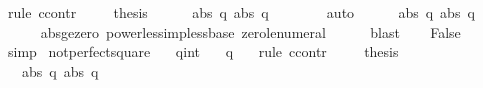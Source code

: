 \begin{isabellebody}
\isamarkupfalse%
\ {\isacharparenleft}rule\ ccontr{\isacharparenright}\isanewline
\ \ \isamarkupfalse%
\ {\isachardoublequoteopen}{\isasymnot}\ {\isacharquery}thesis{\isachardoublequoteclose}\isanewline
\ \ \isamarkupfalse%
\ {\isachardoublequoteopen}{}{\isacharcircum}{}\ {\isacharless}\ {\isacharparenleft}abs\ q{\isacharparenright}{\isacharcircum}{}{\isachardoublequoteclose}\ {\isachardoublequoteopen}{\isacharparenleft}abs\ q{\isacharparenright}{\isacharcircum}{}\ {\isacharless}\ {}{\isacharcircum}{}{\isachardoublequoteclose}\isanewline
\ \ \ \ \isamarkupfalse%
\ auto\isanewline
\ \ \isamarkupfalse%
\ {\isachardoublequoteopen}{}\ {\isacharless}\ abs\ q{\isachardoublequoteclose}\ {\isachardoublequoteopen}abs\ q\ {\isacharless}\ {}{\isachardoublequoteclose}\isanewline
\ \ \ \ \isamarkupfalse%
\ abs{\isacharunderscore}ge{\isacharunderscore}zero\ power{\isacharunderscore}less{\isacharunderscore}imp{\isacharunderscore}less{\isacharunderscore}base\ zero{\isacharunderscore}le{\isacharunderscore}numeral\isanewline
\ \ \ \ \isamarkupfalse%
\ blast{\isacharplus}\isanewline
\ \ \isamarkupfalse%
\ False\isanewline
\ \ \ \ \isamarkupfalse%
\ simp\isanewline
{}\isamarkupfalse%
%
\endisatagproof
{\isafoldproof}%
%
\isadelimproof
\isanewline
%
\endisadelimproof
\isanewline
{}\isamarkupfalse%
\ not{\isacharunderscore}perfect{\isacharunderscore}square{\isacharunderscore}{}{\isacharcolon}\isanewline
\ \ \ q{\isacharcolon}{\isacharcolon}int\isanewline
\ \ \ {\isachardoublequoteopen}q{\isacharcircum}{}\ {\isasymnoteq}\ {}{\isachardoublequoteclose}\isanewline
%
\isadelimproof
%
\endisadelimproof
%
\isatagproof
{}\isamarkupfalse%
\ {\isacharparenleft}rule\ ccontr{\isacharparenright}\isanewline
\ \ \isamarkupfalse%
\ {\isachardoublequoteopen}{\isasymnot}\ {\isacharquery}thesis{\isachardoublequoteclose}\isanewline
\ \ \isamarkupfalse%
\ {\isachardoublequoteopen}{}{\isacharcircum}{}\ {\isacharless}\ {\isacharparenleft}abs\ q{\isacharparenright}{\isacharcircum}{}{\isachardoublequoteclose}\ {\isachardoublequoteopen}{\isacharparenleft}abs\ q{\isacharparenright}{\isacharcircum}{}\ {\isacharless}\ {}{\isacharcircum}{}{\isachardoublequoteclose}\isanewline

\end{isabellebody}
